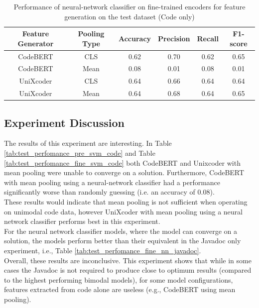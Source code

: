     \begin{table}[H]
        \caption{Performance of neural-network classifier on fine-trained encoders for feature generation on the test dataset (Code only)}
        \label{tab:test_perfomance_fine_nn_code}
        \begin{center}
            \begin{tabular}{c|c|c|c|c|c}
                \textbf{Feature Generator} & \textbf{Pooling Type} & \textbf{Accuracy} & \textbf{Precision} & \textbf{Recall} & \textbf{F1-score}  \\
                \hline
                CodeBERT & CLS & 0.62 & 0.70 & 0.62 & 0.65 \\
                CodeBERT & Mean & 0.08 & 0.01 & 0.08 & 0.01 \\
                UniXcoder & CLS & 0.64 & 0.66 & 0.64 & 0.64 \\
                UniXcoder & Mean & 0.64 & 0.68 & 0.64 & 0.65 \\
            \end{tabular}
        \end{center}
\end{table}

\subsection{Experiment Discussion}

\noindent
The results of this experiment are interesting. In Table \ref{tab:test_perfomance_pre_svm_code} and Table \ref{tab:test_perfomance_fine_svm_code} both CodeBERT and Unixcoder with mean pooling were unable to converge on a solution. Furthermore, CodeBERT with mean pooling using a neural-network classifier had a performance significantly worse than randomly guessing (i.e. an accuracy of $0.08$).\\

\noindent
These results would indicate that mean pooling is not sufficient when operating on unimodal code data, however UniXcoder with mean pooling using a neural network classifier performs best in this experiment.\\

\noindent
For the neural network classifier models, where the model can converge on a solution, the models perform better than their equivalent in the Javadoc only experiment, i.e., Table \ref{tab:test_perfomance_fine_nn_javadoc}. \\

\noindent
Overall, these results are inconclusive. This experiment shows that while in some cases the Javadoc is not required to produce close to optimum results (compared to the highest performing bimodal models), for some model configurations, features extracted from code alone are useless (e.g., CodeBERT using mean pooling).
